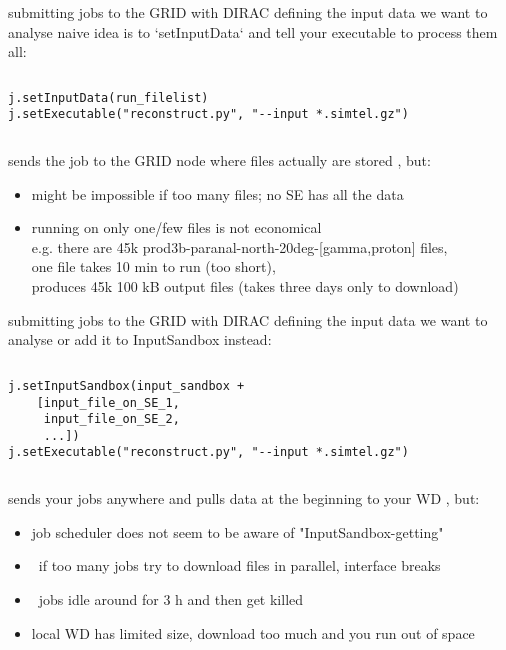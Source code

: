 \documentclass{beamer}
\begin{document}
\begin{frame}[fragile]{submitting jobs to the GRID with DIRAC}
                      {defining the input data we want to analyse}
    naive idea is to `setInputData` and tell your executable to process them all:
    \begin{columns}
        \begin{lstlisting}[basicstyle=\scriptsize,firstnumber=38]
j.setInputData(run_filelist)
j.setExecutable("reconstruct.py", "--input *.simtel.gz")
\end{lstlisting}
    \end{columns}
    sends the job to the GRID node where files actually are stored%
    \pause
    , but:
    \begin{itemize}
        \item might be impossible if too many files; no SE has all the data
        \pause
        \item running on only one/few files is not economical\\
            e.g. there are 45k prod3b-paranal-north-20deg-[gamma,proton] files,\\
            one file takes 10 min to run (too short),\\
            produces 45k 100 kB output files (takes three days only to download)
    \end{itemize}
\end{frame}


\begin{frame}[fragile]{submitting jobs to the GRID with DIRAC}
                      {defining the input data we want to analyse}
    or add it to InputSandbox instead:
    \begin{columns}
        \begin{lstlisting}[basicstyle=\scriptsize,firstnumber=38]
j.setInputSandbox(input_sandbox +
    [input_file_on_SE_1,
     input_file_on_SE_2,
     ...])
j.setExecutable("reconstruct.py", "--input *.simtel.gz")
        \end{lstlisting}
    \end{columns}
    sends your jobs anywhere and pulls data at the beginning to your WD\pause
    , but:
    \begin{itemize}
        \item job scheduler does not seem to be aware of "InputSandbox-getting"
        \pause
        \item \textrightarrow\ if too many jobs try to download files in parallel,
            interface breaks
        \pause
        \item \textrightarrow\ jobs idle around for 3 h and then get killed
        \pause
        \item local WD has limited size, download too much and you run out of space
    \end{itemize}
\end{frame}
\end{document}
